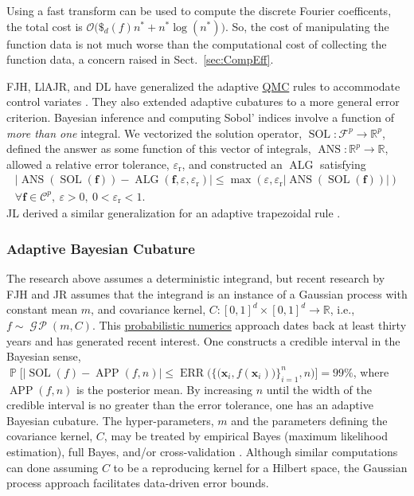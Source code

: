 \documentclass[11pt]{NSFamsart}
\newcommand{\QMC}{\hyperlink{QMClink}{QMC}\xspace}
\DeclareMathOperator{\GP}{\mathcal{G} \! \mathcal{P}}
\newcommand{\reals}{{\mathbb{R}}}
\newcommand{\vf}{\boldsymbol{f}}
\DeclareMathOperator{\Ans}{ANS}
\DeclareMathOperator{\SOL}{SOL}
\DeclareMathOperator{\APP}{APP}
\DeclareMathOperator{\ALG}{ALG}
\DeclareMathOperator{\ERR}{ERR}
\newcommand{\bx}{{\boldsymbol{x}}}
\newcommand{\cc}{\mathcal{C}}
\newcommand{\calf}{{\mathcal{F}}}
\DeclareMathOperator{\Prob}{\mathbb{P}}
\def\abs#1{\ensuremath{\left \lvert #1 \right \rvert}}
\newcommand{\Order}{\mathcal{O}}
\newcommand{\reltol}{\varepsilon_{\text{r}}}
\newcommand{\dataN}{\bigl\{\bigl(\bx_i,f(\bx_i)\bigr)\bigr\}_{i=1}^n}
\newcommand{\ErrN}{\ERR\bigl(\dataN,n\bigr)}
\begin{document}
Using a fast transform can be used to compute the discrete Fourier coefficents, the total cost is $\Order\bigl(\$_d(f)n^* + n^* \log(n^*)\bigr)$.  So, the cost of manipulating the function data is not much worse than the computational cost of collecting the function data, a concern raised in Sect.\ \ref{sec:CompEff}.

FJH, LlAJR, and DL have generalized the adaptive \QMC rules to accommodate control variates \cite{HicEtal17a}.  They also extended adaptive cubatures to a more general error criterion.  Bayesian inference \cite{GelEtal13} and computing Sobol' indices \cite{Sal02a} involve a function of \emph{more than one} integral. We vectorized the solution operator, $\SOL : \calf^p \to \reals^p$, defined the answer as some function of this vector of integrals, $\Ans: \reals^p \to \reals$, allowed a relative error tolerance, $\reltol$, and constructed an $\ALG$ satisfying
\begin{multline}
\label{generrorcrit} \tag{G-ALG-CRIT}
\abs{\Ans(\SOL(\vf)) - \ALG(\vf,\varepsilon, \reltol) } \le \max(\varepsilon, \reltol \abs{\Ans(\SOL(\vf))} ) \\
\forall \vf \in \cc^p, \ \varepsilon > 0, \ 0 < \reltol < 1 .
\end{multline}
JL derived a similar generalization for an adaptive trapezoidal rule \cite{Liu17a}.


\subsubsection{Adaptive Bayesian Cubature}  \label{sec:Bayes} 
The research above assumes a deterministic integrand, but recent research by FJH and JR assumes that the integrand is an instance of a Gaussian process with constant mean $m$, and covariance kernel, $C:[0,1]^d \times [0,1]^d \to \reals$, i.e., 
$f \sim \GP (m,C)$.  This \href{http://www.probabilistic-numerics.org}{probabilistic numerics} approach dates back at least thirty years \cite{Dia88a, OHa91a, RasGha03a, Rit00a} and has generated recent interest. One constructs a credible interval in the Bayesian sense, $\Prob\bigl[\abs{\SOL(f) 
- \APP(f,n)} \le \ErrN \bigr] = 99\%$, where $\APP(f,n)$ is the posterior mean.  By increasing $n$ until the width of the credible interval is no greater than the error tolerance, one has an adaptive Bayesian cubature.  The hyper-parameters, $m$ and the parameters defining the covariance kernel, $C$, may be treated by empirical Bayes (maximum likelihood estimation), full Bayes, and/or cross-validation \cite{RatHic19a}.  Although similar computations can done assuming $C$ to be a reproducing kernel for a Hilbert space, the Gaussian process approach facilitates data-driven error bounds.
\end{document}

